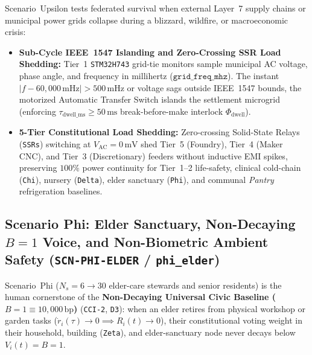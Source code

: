 Scenario~Upsilon tests federated survival when external Layer~7 supply chains or municipal power grids collapse during a blizzard, wildfire, or macroeconomic crisis:
\begin{itemize}
    \item \textbf{Sub-Cycle IEEE~1547 Islanding and Zero-Crossing SSR Load Shedding:} Tier~1 \texttt{STM32H743} grid-tie monitors sample municipal AC voltage, phase angle, and frequency in millihertz ($\mathtt{grid\_freq\_mhz}$). The instant $|f - 60{,}000\,\mathrm{mHz}| > 500\,\mathrm{mHz}$ or voltage sags outside IEEE~1547 bounds, the motorized Automatic Transfer Switch islands the settlement microgrid (enforcing $\tau_{\mathrm{dwell\_ms}} \ge 50\,\mathrm{ms}$ break-before-make interlock $\Phi_{\mathrm{dwell}}$).
    \item \textbf{5-Tier Constitutional Load Shedding:} Zero-crossing Solid-State Relays (\texttt{SSRs}) switching at $V_{\mathrm{AC}} = 0\,\mathrm{mV}$ shed Tier~5 (Foundry), Tier~4 (Maker CNC), and Tier~3 (Discretionary) feeders without inductive EMI spikes, preserving $100\%$ power continuity for Tier~1--2 life-safety, clinical cold-chain (\texttt{Chi}), nursery (\texttt{Delta}), elder sanctuary (\texttt{Phi}), and communal \textit{Pantry} refrigeration baselines.
\end{itemize}

\subsection{Scenario Phi: Elder Sanctuary, Non-Decaying $B=1$ Voice, and Non-Biometric Ambient Safety (\texttt{SCN-PHI-ELDER} / \texttt{phi\_elder})}

Scenario~Phi ($N_s = 6 \to 30$ elder-care stewards and senior residents) is the human cornerstone of the \textbf{Non-Decaying Universal Civic Baseline ($B = 1 \equiv 10{,}000\,\mathrm{bp}$)} (\texttt{CCI-2}, \texttt{D3}): when an elder retires from physical workshop or garden tasks ($\dot{r}_i(\tau) \to 0 \implies R_i(t) \to 0$), their constitutional voting weight in their household, building (\texttt{Zeta}), and elder-sanctuary node never decays below $V_i(t) = B = 1$.

